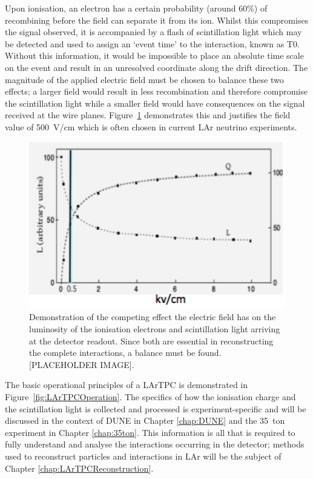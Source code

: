 Upon ionisation, an electron has a certain probability (around 60\%) of recombining before the field can separate it from its ion.  Whilst this compromises the signal observed, it is accompanied by a flash of scintillation light which may be detected and used to assign an `event time' to the interaction, known as T0.  Without this information, it would be impossible to place an absolute time scale on the event and result in an unresolved coordinate along the drift direction.  The magnitude of the applied electric field must be chosen to balance these two effects; a larger field would result in less recombination and therefore compromise the scintillation light while a smaller field would have consequences on the signal received at the wire planes.  Figure~\ref{fig:ElectricFieldScintillationIonisation} demonstrates this and justifies the field value of 500~V/cm which is often chosen in current LAr neutrino experiments.

\begin{figure}
  \centering
  \includegraphics[width=12cm]{ElectricFieldScintillationIonisation.png}
  \caption[Effect of electric field on luminosity of ionisation electrons and scintillation light in a LArTPC.]{Demonstration of the competing effect the electric field has on the luminosity of the ionisation electrons and scintillation light arriving at the detector readout.  Since both are essential in reconstructing the complete interactions, a balance must be found. [PLACEHOLDER IMAGE].}
  \label{fig:ElectricFieldScintillationIonisation}
\end{figure}

The basic operational principles of a LArTPC is demonstrated in Figure~\ref{fig:LArTPCOperation}.  The specifics of how the ionisation charge and the scintillation light is collected and processed is experiment-specific and will be discussed in the context of DUNE in Chapter \ref{chap:DUNE} and the 35~ton experiment in Chapter \ref{chap:35ton}.  This information is all that is required to fully understand and analyse the interactions occurring in the detector; methods used to reconstruct particles and interactions in LAr will be the subject of Chapter \ref{chap:LArTPCReconstruction}.


